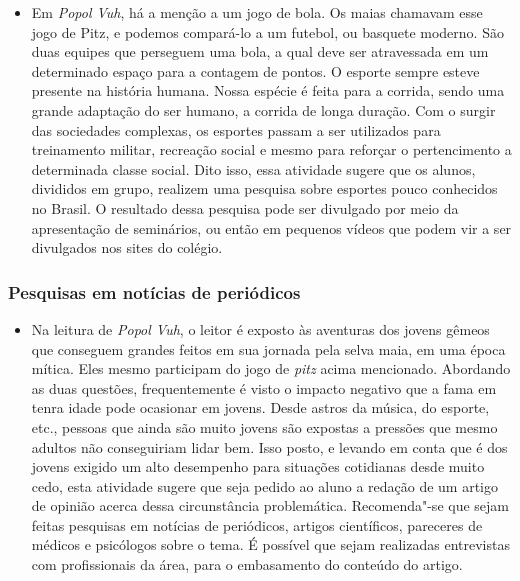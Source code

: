 \documentclass[12pt]{extarticle}
\begin{document}
\begin{itemize}
\item
  Em \emph{Popol Vuh}, há a menção a um jogo de bola. Os maias chamavam
  esse jogo de Pitz, e podemos compará-lo a um futebol, ou basquete
  moderno. São duas equipes que perseguem uma bola, a qual deve ser
  atravessada em um determinado espaço para a contagem de pontos. O
  esporte sempre esteve presente na história humana. Nossa espécie é
  feita para a corrida, sendo uma grande adaptação do ser humano, a
  corrida de longa duração. Com o surgir das sociedades complexas, os
  esportes passam a ser utilizados para treinamento militar, recreação
  social e mesmo para reforçar o pertencimento a determinada classe
  social. Dito isso, essa atividade sugere que os alunos, divididos em
  grupo, realizem uma pesquisa sobre esportes pouco conhecidos no
  Brasil. O resultado dessa pesquisa pode ser divulgado por meio da
  apresentação de seminários, ou então em pequenos vídeos que podem vir
  a ser divulgados nos sites do colégio.
\end{itemize}

\subsubsection{Pesquisas em notícias de periódicos}


\begin{itemize}
\item
  Na leitura de \emph{Popol Vuh}, o leitor é exposto às aventuras dos
  jovens gêmeos que conseguem grandes feitos em sua jornada pela selva
  maia, em uma época mítica. Eles mesmo participam do jogo de
  \emph{pitz} acima mencionado. Abordando as duas questões,
  frequentemente é visto o impacto negativo que a fama em tenra idade
  pode ocasionar em jovens. Desde astros da música, do esporte, etc.,
  pessoas que ainda são muito jovens são expostas a pressões que mesmo
  adultos não conseguiriam lidar bem. Isso posto, e levando em conta que
  é dos jovens exigido um alto desempenho para situações cotidianas
  desde muito cedo, esta atividade sugere que seja pedido ao aluno a
  redação de um artigo de opinião acerca dessa circunstância
  problemática. Recomenda"-se que sejam feitas pesquisas em notícias de
  periódicos, artigos científicos, pareceres de médicos e psicólogos
  sobre o tema. É possível que sejam realizadas entrevistas com
  profissionais da área, para o embasamento do conteúdo do artigo.
\end{itemize}
\end{document}

